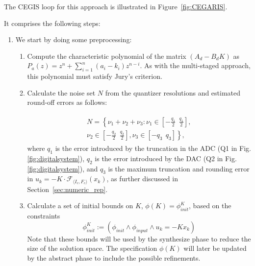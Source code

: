 The CEGIS loop for this approach is illustrated in Figure~\ref{fig:CEGARIS}. 
%

It comprises the following steps:  
\begin{enumerate}
\item 
  We start by doing some preprocessing:%
  \begin{enumerate}
\item Compute the characteristic polynomial of the matrix $(A_d-B_dK)$ as 
$P_a(z) = z^n+\sum_{i=1}^n{(a_i-k_i)z^{n-i}}$.  As with the multi-staged approach, this polynomial must satisfy Jury's criterion.


\item Calculate the noise set $N$ from the quantizer resolutions and estimated round-off errors as follows: 

\begin{align*}
\nonumber
\begin{split}
N=\left \{ \nu_1+\nu_2+ \nu_3: \nu_1 \in \left[-\frac{q_1}{2}\ \ \frac{q_1}{2}\right] , \right. \\ \left. \nu_2 \in \left[-\frac{q_2}{2}\ \ \frac{q_2}{2}\right],  \nu_3 \in \left[-q_3\ \ q_3\right]  \right \}, 
\end{split}
\end{align*}
%
where  $q_1$ is the error introduced by the truncation in the ADC (Q1 in Fig. \ref{fig:digitalsystem}), 
$q_2$ is the error introduced by the DAC (Q2 in Fig. \ref{fig:digitalsystem}), 
and $q_3$ is the maximum truncation and rounding error in $u_k=-K \cdot \mathcal{F}_{\langle I_c,F_c \rangle}(x_k)$, 
as further discussed in Section~\ref{sec:numeric_rep}.

\item Calculate a set of initial bounds on $K$, $\phi(K)=\phi_\mathit{init}^{K}$,
based on the constraints %
%
$$
\phi_\mathit{init}^{K} := (\phi_\mathit{init} \wedge \phi_\mathit{input} \wedge u_k=-K x_k)
$$
Note that these bounds will be used by the {\sc synthesize} phase to reduce the size of the solution space.
The specification $\phi(K)$ will later be updated by the {\sc abstract} phase to include the possible refinements. 


\end{enumerate}
\end{enumerate}
